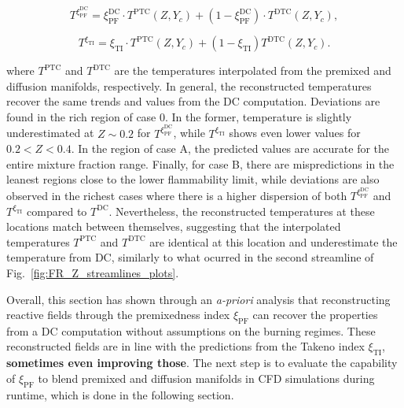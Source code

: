 \documentclass[preprint,12pt,authoryear]{elsarticle}
\begin{document}
{    \begin{equation}
    \label{eq:T_reconstr_PF}
    T^{\xi_\mathrm{PF}^\mathrm{DC}} = \xi_\mathrm{PF}^\mathrm{DC} \cdot  
    T^\mathrm{PTC} \left( Z, Y_c \right) + \left( 1 -  \xi_\mathrm{PF}^\mathrm{DC} \right) \cdot  T^\mathrm{DTC} \left( Z, Y_c \right), 
    \end{equation}


    \begin{equation}
    \label{eq:T_reconstr_TI}
    T^{\xi_\mathrm{TI}} = \xi_\mathrm{TI} \cdot  T^\mathrm{PTC} \left( Z, Y_c \right) + \left( 1 -  \xi_\mathrm{TI} \right) T^\mathrm{DTC} \left( Z, Y_c \right).
    \end{equation}

where $T^\mathrm{PTC}$ and $T^\mathrm{DTC}$ are the temperatures interpolated from the premixed and diffusion manifolds, respectively. In general, the reconstructed temperatures recover the same trends and values from the DC computation. Deviations are found in the rich region of case 0. In the former, temperature is slightly underestimated at $Z \sim 0.2$ for $T^{\xi_\mathrm{PF}^\mathrm{DC}}$, while $T^{\xi_\mathrm{TI}}$ shows even lower values for $0.2 < Z < 0.4$. In the region of case A, the predicted values are accurate for the entire mixture fraction range. Finally, for case B, there are mispredictions in the leanest regions close to the lower flammability limit, while deviations are also observed in the richest cases where there is a higher dispersion of both $T^{\xi_\mathrm{PF}^\mathrm{DC}}$ and $T^{\xi_\mathrm{TI}}$ compared to $T^\mathrm{DC}$. Nevertheless, the reconstructed temperatures at these locations match between themselves, suggesting that the interpolated temperatures $T^\mathrm{PTC}$ and $T^\mathrm{DTC}$ are identical at this location and underestimate the temperature from DC, similarly to what ocurred in the second streamline of Fig.~\ref{fig:FR_Z_streamlines_plots}.

Overall, this section has shown through an \textsl{a-priori} analysis that reconstructing reactive fields through the premixedness index $\xi_\mathrm{PF}$ can recover the properties from a DC computation without assumptions on the burning regimes. These reconstructed fields are in line with the predictions from the Takeno index $\xi_\mathrm{TI}$, \textbf{sometimes even improving those}. The next step is to evaluate the capability of $\xi_\mathrm{PF}$ to blend premixed and diffusion manifolds in CFD simulations during runtime, which is done in the following section.

}
\end{document}
